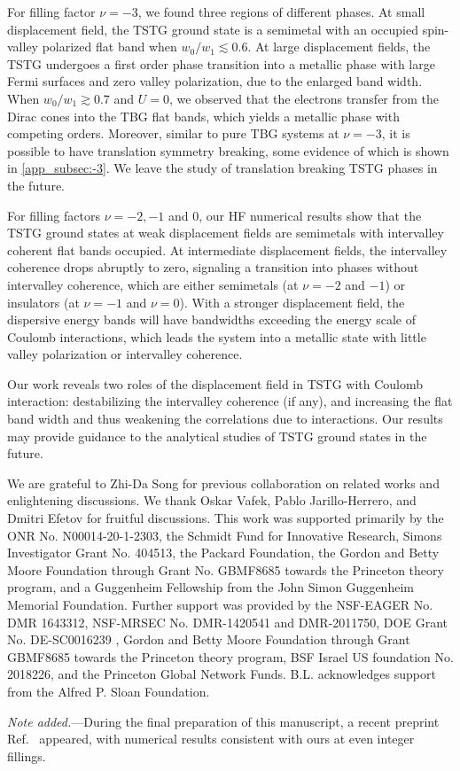 \documentclass[prb,aps,nofootinbib,amssymb,twocolumn,superscriptaddress,10pt]{revtex4-2}
\begin{document}
For filling factor $\nu=-3$, we found three regions of different phases. At small displacement field, the TSTG ground state is a semimetal with an occupied spin-valley polarized flat band when $w_0/w_1 \lesssim 0.6$. At large displacement fields, the TSTG undergoes a first order phase transition into a metallic phase with large Fermi surfaces and zero valley polarization, due to the enlarged band width. When $w_0/w_1 \gtrsim 0.7$ and $U = 0$, we observed that the electrons transfer from the Dirac cones into the TBG flat bands, which yields a metallic phase with competing orders. Moreover, similar to pure TBG systems at $\nu=-3$, it is possible to have translation symmetry breaking, some evidence of which is shown in \ref{app_subsec:-3}. We leave the study of translation breaking TSTG phases in the future.

For filling factors $\nu=-2, -1$ and $0$, our HF numerical results show that the TSTG ground states at weak displacement fields are semimetals with intervalley coherent flat bands occupied.
At intermediate displacement fields, the intervalley coherence drops abruptly to zero, signaling a transition into phases without intervalley coherence, which are either semimetals (at $\nu=-2$ and $-1$) or insulators (at $\nu=-1$ and $\nu=0$). With a stronger displacement field, the dispersive energy bands will have bandwidths exceeding the energy scale of Coulomb interactions, which leads the system into a metallic state with little valley polarization or intervalley coherence. 


Our work reveals two roles of the displacement field in TSTG with Coulomb interaction: destabilizing the intervalley coherence (if any), and increasing the flat band width and thus weakening the correlations due to interactions. Our results may provide guidance to the analytical studies of TSTG ground states in the future.

\begin{acknowledgments}
We are grateful to Zhi-Da Song for previous collaboration on related works and enlightening discussions. We thank Oskar Vafek, Pablo Jarillo-Herrero, and Dmitri Efetov for fruitful discussions. This work was supported primarily by the ONR No. N00014-20-1-2303, the Schmidt Fund for Innovative Research, Simons Investigator Grant No. 404513, the Packard Foundation, the Gordon and Betty Moore Foundation through Grant No. GBMF8685 towards the Princeton theory program, and a Guggenheim Fellowship from the John Simon Guggenheim Memorial Foundation. Further support was provided by the NSF-EAGER No. DMR 1643312, NSF-MRSEC No. DMR-1420541 and DMR-2011750, DOE Grant No. DE-SC0016239 , Gordon and Betty Moore Foundation through Grant GBMF8685 towards the Princeton theory program, BSF Israel US foundation No. 2018226, and the Princeton Global Network Funds. B.L. acknowledges support from the Alfred P. Sloan Foundation.
\end{acknowledgments}
\noindent
{\it Note added.}---During the final preparation of this manuscript, a recent preprint Ref.~\cite{christos2021correlated} appeared, with numerical results consistent with ours at even integer fillings.
\end{document}

